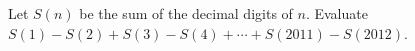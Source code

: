 Let $S(n)$ be the sum of the decimal digits of $n$. Evaluate $S(1)-S(2)+S(3)-S(4)+\cdots+S(2011)-S(2012)$.
